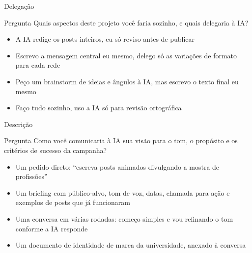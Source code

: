 \documentclass[aspectratio=169,11pt]{beamer}
\begin{document}
\begin{frame}{Delegação}
  \begin{notebox}{Pergunta}
    \small Quais aspectos deste projeto você faria sozinho, e quais delegaria à IA?
  \end{notebox}
  \vspace{0.3cm}
  \begin{itemize}
    \item[\textbf{\color{terracota}A}] A IA redige os posts inteiros, eu só reviso antes de publicar
    \item[\textbf{\color{terracota}B}] Escrevo a mensagem central eu mesmo, delego só as variações de formato para cada rede
    \item[\textbf{\color{terracota}C}] Peço um brainstorm de ideias e ângulos à IA, mas escrevo o texto final eu mesmo
    \item[\textbf{\color{terracota}D}] Faço tudo sozinho, uso a IA só para revisão ortográfica
  \end{itemize}
\end{frame}

\begin{frame}{Descrição}
  \begin{notebox}{Pergunta}
    \small Como você comunicaria à IA sua visão para o tom, o propósito e os critérios de sucesso da campanha?
  \end{notebox}
  \vspace{0.3cm}
  \begin{itemize}
    \item[\textbf{\color{terracota}A}] Um pedido direto: ``escreva posts animados divulgando a mostra de profissões''
    \item[\textbf{\color{terracota}B}] Um briefing com público-alvo, tom de voz, datas, chamada para ação e exemplos de posts que já funcionaram
    \item[\textbf{\color{terracota}C}] Uma conversa em várias rodadas: começo simples e vou refinando o tom conforme a IA responde
    \item[\textbf{\color{terracota}D}] Um documento de identidade de marca da universidade, anexado à conversa
  \end{itemize}
\end{frame}
\end{document}
